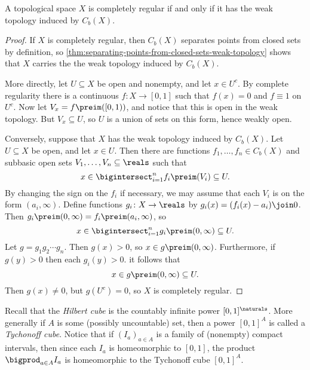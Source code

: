 \documentclass[article, a4paper, 11pt, oneside]{memoir}
\numberwithin{equation}{chapter}
\begin{document}
\begin{theorem}
    \label{thm:completely-regular-weak-topology}
    A topological space $X$ is completely regular if and only if it has the weak topology induced by $C_b(X)$.
\end{theorem}

\begin{proof}
    If $X$ is completely regular, then $C_b(X)$ separates points from closed sets by definition, so \cref{thm:separating-points-from-closed-sets-weak-topology} shows that $X$ carries the the weak topology induced by $C_b(X)$.

    More directly, let $U \subseteq X$ be open and nonempty, and let $x \in U^c$. By complete regularity there is a continuous $f \colon X \to [0,1]$ such that $f(x) = 0$ and $f \equiv 1$ on $U^c$. Now let $V_x = f\preim([0,1))$, and notice that this is open in the weak topology. But $V_x \subseteq U$, so $U$ is a union of sets on this form, hence weakly open.

    Conversely, suppose that $X$ has the weak topology induced by $C_b(X)$. Let $U \subseteq X$ be open, and let $x \in U$. Then there are functions $f_1, \ldots, f_n \in C_b(X)$ and subbasic open sets $V_1, \ldots, V_n \subseteq \reals$ such that
    \begin{equation*}
        x
            \in \bigintersect_{i=1}^n f_i\preim(V_i)
            \subseteq U.
    \end{equation*}
    By changing the sign on the $f_i$ if necessary, we may assume that each $V_i$ is on the form $(a_i, \infty)$. Define functions $g_i \colon X \to \reals$ by $g_i(x) = (f_i(x) - a_i) \join 0$. Then $g_i\preim(0,\infty) = f_i\preim(a_i,\infty)$, so
    \begin{equation*}
        x
            \in \bigintersect_{i=1}^n g_i\preim(0,\infty)
            \subseteq U.
    \end{equation*}
    Let $g = g_1 g_2 \cdots g_n$. Then $g(x) > 0$, so $x \in g\preim(0,\infty)$. Furthermore, if $g(y) > 0$ then each $g_i(y) > 0$. it follows that
    \begin{equation*}
        x
            \in g\preim(0,\infty)
            \subseteq U.
    \end{equation*}
    Then $g(x) \neq 0$, but $g(U^c) = 0$, so $X$ is completely regular.
\end{proof}


Recall that the \emph{Hilbert cube} is the countably infinite power $[0,1]^\naturals$. More generally if $A$ is some (possibly uncountable) set, then a power $[0,1]^A$ is called a \emph{Tychonoff cube}. Notice that if $(I_a)_{a \in A}$ is a family of (nonempty) compact intervals, then since each $I_a$ is homeomorphic to $[0,1]$, the product $\bigprod_{a \in A} I_a$ is homeomorphic to the Tychonoff cube $[0,1]^A$.
\end{document}
